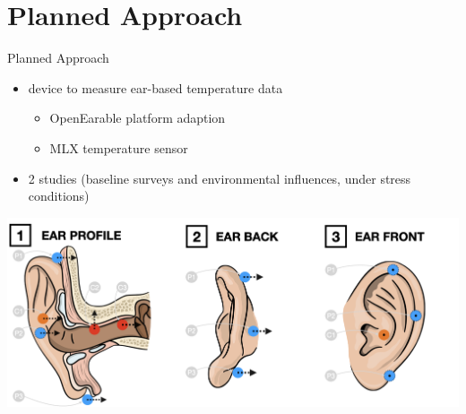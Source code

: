 \documentclass[en]{sdqbeamer}
\begin{document}

\section{Planned Approach}
\begin{frame}{Planned Approach}
    \begin{itemize}
        \item device to measure ear-based temperature data
        \begin{itemize}
            \item OpenEarable platform adaption
            \item MLX temperature sensor
        \end{itemize}
        \item 2 studies (baseline surveys and environmental influences, under stress conditions)
    \end{itemize}
    \begin{center}
        \includegraphics[scale=0.17]{../thesis-doc/images/ear_measurement_points/emp.png}    
    \end{center}
\end{frame}
\end{document}

